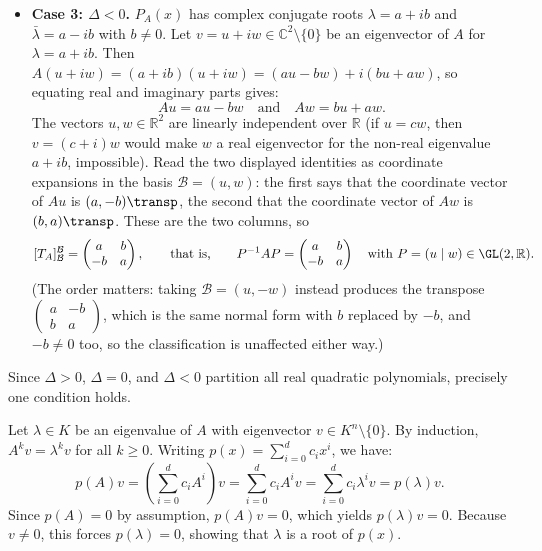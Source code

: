 \begin{exercisesolution}
\begin{itemize}
    \item \textbf{Case 3: $\Delta < 0$.}
    $P_A(x)$ has complex conjugate roots $\lambda = a + ib$ and $\bar{\lambda} = a - ib$ with $b \ne 0$.
    Let $v = u + iw \in \mathbb{C}^2 \setminus \{0\}$ be an eigenvector of $A$ for $\lambda = a + ib$.
    Then $A(u + iw) = (a + ib)(u + iw) = (au - bw) + i(bu + aw)$, so equating real and imaginary parts gives:
    \[
    Au = au - bw \quad \text{and} \quad Aw = bu + aw.
    \]
    The vectors $u, w \in \mathbb{R}^2$ are linearly independent over $\mathbb{R}$ (if $u = c w$, then $v = (c+i)w$ would make $w$ a real eigenvector for the non-real eigenvalue $a+ib$, impossible).
    Read the two displayed identities as coordinate expansions in the basis $\mathcal{B} = (u, w)$: the first says that the coordinate vector of $Au$ is $(a, -b)\transp$, the second that the coordinate vector of $Aw$ is $(b, a)\transp$. These are the two columns, so
    \[
    [T_A]_{\mathcal{B}}^{\mathcal{B}} = \begin{pmatrix} a & b \\ -b & a \end{pmatrix}, \qquad\text{that is,}\qquad P^{-1} A P = \begin{pmatrix} a & b \\ -b & a \end{pmatrix} \quad\text{with } P = (u \mid w) \in \GL(2, \mathbb{R}).
    \]
    (The order matters: taking $\mathcal{B} = (u, -w)$ instead produces the transpose $\left(\begin{smallmatrix} a & -b \\ b & a \end{smallmatrix}\right)$, which is the same normal form with $b$ replaced by $-b$, and $-b \ne 0$ too, so the classification is unaffected either way.)
\end{itemize}
Since $\Delta > 0$, $\Delta = 0$, and $\Delta < 0$ partition all real quadratic polynomials, precisely one condition holds.
\end{exercisesolution}

\begin{exercisesolution}
\label{sol:eigenvalues_are_roots_of_annihilating_polynomials}
Let $\lambda \in K$ be an eigenvalue of $A$ with eigenvector $v \in K^n \setminus \{0\}$.
By induction, $A^k v = \lambda^k v$ for all $k \ge 0$.
Writing $p(x) = \sum_{i=0}^d c_i x^i$, we have:
\[
p(A) v = \left(\sum_{i=0}^d c_i A^i\right) v = \sum_{i=0}^d c_i A^i v = \sum_{i=0}^d c_i \lambda^i v = p(\lambda) v.
\]
Since $p(A) = 0$ by assumption, $p(A) v = 0$, which yields $p(\lambda) v = 0$.
Because $v \ne 0$, this forces $p(\lambda) = 0$, showing that $\lambda$ is a root of $p(x)$.
\end{exercisesolution}

